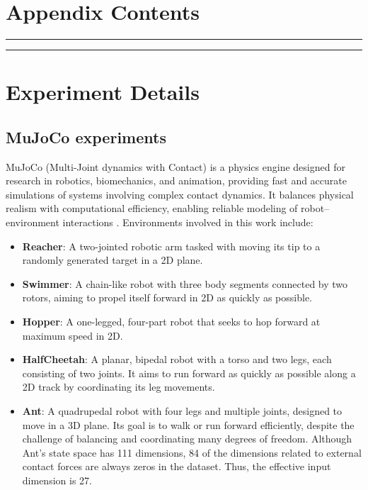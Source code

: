 \appendix
{}

\section*{\LARGE \bfseries Appendix Contents}
\label{sec:appendix_toc}

\par\vspace{0.5em}
\noindent\rule{\textwidth}{0.6pt}
\vspace{0.3em}

\startcontents[appendix]

\par\vspace{0.3em}
\noindent\rule{\textwidth}{0.6pt}
\vspace{0.5em}

\clearpage


\section{Experiment Details} \label{appx:exp_details}



\subsection{MuJoCo experiments} \label{appx: mujoco}
MuJoCo (Multi-Joint dynamics with Contact) is a physics engine designed for research in robotics, biomechanics, and animation, providing fast and accurate simulations of systems involving complex contact dynamics. It balances physical realism with computational efficiency, enabling reliable modeling of robot–environment interactions \citep{towers2024gymnasium}. Environments involved in this work include:

\begin{itemize}
    \item \textbf{Reacher}: A two-jointed robotic arm tasked with moving its tip to a randomly generated target in a 2D plane. 
    \item \textbf{Swimmer}: A chain-like robot with three body segments connected by two rotors, aiming to propel itself forward in 2D as quickly as possible.
    \item \textbf{Hopper}: A one-legged, four-part robot that seeks to hop forward at maximum speed in 2D.
    \item \textbf{HalfCheetah}: A planar, bipedal robot with a torso and two legs, each consisting of two joints. It aims to run forward as quickly as possible along a 2D track by coordinating its leg movements.
    \item \textbf{Ant}: A quadrupedal robot with four legs and multiple joints, designed to move in a 3D plane. Its goal is to walk or run forward efficiently, despite the challenge of balancing and coordinating many degrees of freedom. Although Ant's state space has 111 dimensions, 84 of the dimensions related to external contact forces are always zeros in the dataset. Thus, the effective input dimension is 27.
\end{itemize}

